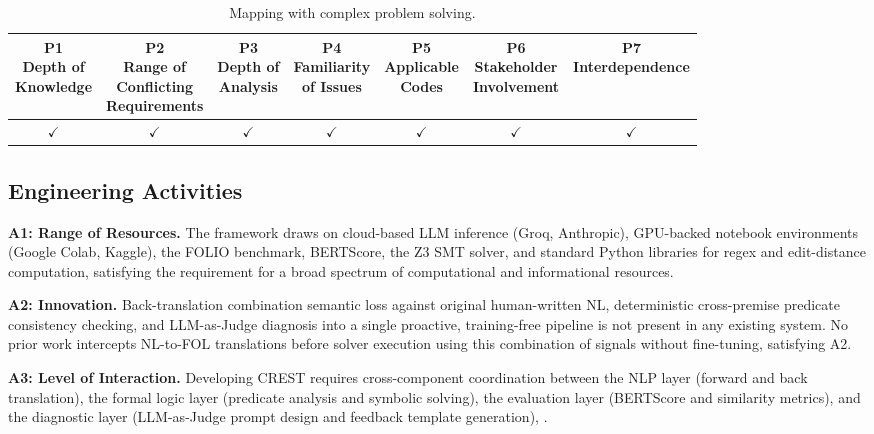 \begin{table}[htpb]
\centering

\vspace{0.5em}
\begin{tabular}{|c|c|c|c|c|c|c|}
\hline
\thead{P1\\Depth of\\Knowledge} & \thead{P2\\Range of\\Conflicting\\Requirements} & \thead{P3\\Depth of\\Analysis} & \thead{P4\\Familiarity\\of Issues} & \thead{P5\\Applicable\\Codes} & \thead{P6\\Stakeholder\\Involvement} & \thead{P7\\Interdependence} \\ \hline
$\checkmark$ & $\checkmark$ & $\checkmark$ & $\checkmark$ & $\checkmark$ & $\checkmark$ & $\checkmark$ \\ \hline
\end{tabular}
\caption{Mapping with complex problem solving.}
\end{table}

\subsection{Engineering Activities}

\textbf{A1: Range of Resources.}
The framework draws on cloud-based LLM inference (Groq, Anthropic), GPU-backed notebook environments (Google Colab, Kaggle), the FOLIO benchmark, BERTScore, the Z3 SMT solver, and standard Python libraries for regex and edit-distance computation, satisfying the requirement for a broad spectrum of computational and informational resources.

\textbf{A2: Innovation.}
Back-translation combination semantic loss against original human-written NL, deterministic cross-premise predicate consistency checking, and LLM-as-Judge diagnosis into a single proactive, training-free pipeline is not present in any existing system. No prior work intercepts NL-to-FOL translations before solver execution using this combination of signals without fine-tuning, satisfying A2.

\textbf{A3: Level of Interaction.}
Developing CREST requires cross-component coordination between the NLP layer (forward and back translation), the formal logic layer (predicate analysis and symbolic solving), the evaluation layer (BERTScore and similarity metrics), and the diagnostic layer (LLM-as-Judge prompt design and feedback template generation), .

